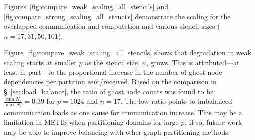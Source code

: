 \documentclass{report}
\begin{document}
Figures~\ref{fig:compare_weak_scaling_all_stencils} and \ref{fig:compare_strong_scaling_all_stencils} demonstrate the scaling for the overlapped communication and computation and various stencil sizes ($n=17,31,50,101$). 

Figure~\ref{fig:compare_weak_scaling_all_stencils} shows that degradation in weak scaling starts at smaller $p$ as the stencil size, $n$, grows. This is attributed---at least in part---to the proportional increase in the number of ghost node dependencies per partition sent/received. Based on the comparison in \S~\ref{sec:load_balance}, the ratio of ghost node counts was found to be $\frac{\min N_r}{\max N_r} = 0.39$ for $p=1024$ and $n=17$. The low ratio points to imbalanced communication loads as one cause for communication increase. 
This may be a limitation in METIS when partitioning domains for large $p$. If so, future work may be able to improve balancing with other graph partitioning methods. 
\end{document}
